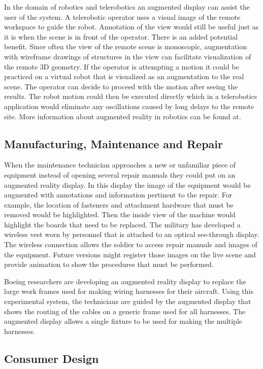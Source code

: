 In the domain of robotics and telerobotics an augmented display can assist the user of the system. A telerobotic operator uses a visual image of the remote workspace to guide the robot. Annotation of the view would still be useful just as it is when the scene is in front of the operator. There is an added potential benefit. Since often the view of the remote scene is monoscopic, augmentation with wireframe drawings of structures in the view can facilitate visualization of the remote 3D geometry. If the operator is attempting a motion it could be practiced on a virtual robot that is visualized as an augmentation to the real scene. The operator can decide to proceed with the motion after seeing the results. The robot motion could then be executed directly which in a telerobotics application would eliminate any oscillations caused by long delays to the remote site. More information about augmented reality in robotics can be found at.

\subsection{Manufacturing, Maintenance and Repair}

When the maintenance technician approaches a new or unfamiliar piece of equipment instead of opening several repair manuals they could put on an augmented reality display. In this display the image of the equipment would be augmented with annotations and information pertinent to the repair. For example, the location of fasteners and attachment hardware that must be removed would be highlighted. Then the inside view of the machine would highlight the boards that need to be replaced. The military has developed a wireless vest worn by personnel that is attached to an optical see-through display. The wireless connection allows the soldier to access repair manuals and images of the equipment. Future versions might register those images on the live scene and provide animation to show the procedures that must be performed.

Boeing researchers are developing an augmented reality display to replace the large work frames used for making wiring harnesses for their aircraft. Using this experimental system, the technicians are guided by the augmented display that shows the routing of the cables on a generic frame used for all harnesses. The augmented display allows a single fixture to be used for making the multiple harnesses.

\subsection{Consumer Design}

